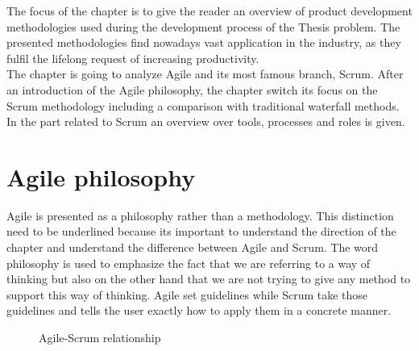 \documentclass[../main.tex]{subfiles}
\begin{document}
The focus of the chapter is to give the reader an overview of product development methodologies used during the development process of the Thesis problem. The presented methodologies find nowadays vast application in the industry, as they fulfil the  lifelong request of increasing productivity.\\
The chapter is going to analyze Agile and its most famous branch, Scrum. After an introduction of the Agile philosophy, the chapter switch its focus on the Scrum methodology including a comparison with traditional waterfall methods. In the part related to Scrum an overview over tools, processes and roles is given.\\
\section{Agile philosophy}
Agile is presented as a philosophy rather than a methodology. This distinction need to be underlined because its important to understand the direction of the chapter and understand the difference between Agile and Scrum.
The word philosophy is used to emphasize the fact that we are referring to a way of thinking but also on the other hand that we are not trying to give any method to support this way of thinking. Agile set guidelines while Scrum take those guidelines and tells the user exactly how to apply them in a concrete manner.
\begin{figure}
    \centering
{} 
    \caption{Agile-Scrum relationship}
    \label{fig:SCRUMAGstr}
\end{figure}
\end{document}
